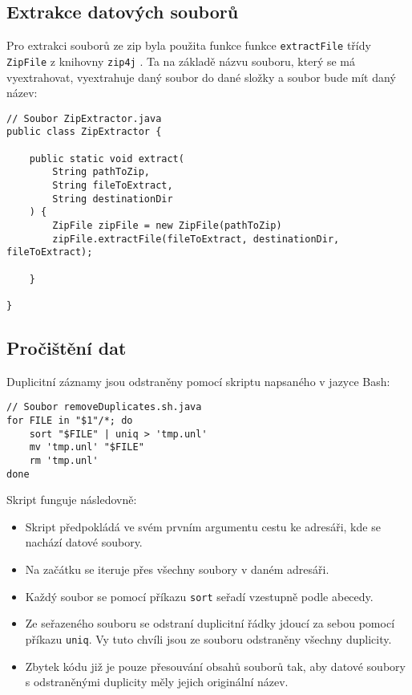 \subsection{Extrakce datových souborů}
Pro extrakci souborů ze zip byla použita funkce funkce \lstinline|extractFile| třídy \lstinline|ZipFile| z knihovny \lstinline|zip4j| \cite{zip4j}. Ta na základě názvu souboru, který se má vyextrahovat, vyextrahuje daný soubor do dané složky a soubor bude mít daný název:

\begin{lstlisting}[caption={Ukázka extrakce souborů ze zipu}, label={lst:zip4j}, tabsize=2]
// Soubor ZipExtractor.java
public class ZipExtractor {

	public static void extract(
		String pathToZip, 
		String fileToExtract, 
		String destinationDir
	) {
		ZipFile zipFile = new ZipFile(pathToZip)
		zipFile.extractFile(fileToExtract, destinationDir, fileToExtract);
		
	}
		
}
\end{lstlisting}

\subsection{Pročištění dat}
Duplicitní záznamy jsou odstraněny pomocí skriptu napsaného v jazyce Bash:

\begin{lstlisting}[caption={Skript pro odstranění duplicitních řádků}, tabsize=2]
// Soubor removeDuplicates.sh.java
for FILE in "$1"/*; do
	sort "$FILE" | uniq > 'tmp.unl'
	mv 'tmp.unl' "$FILE"
	rm 'tmp.unl'
done
\end{lstlisting}

\noindent Skript funguje následovně:

\begin{itemize}
	\item Skript předpokládá ve svém prvním argumentu cestu ke adresáři, kde se nachází datové soubory.
	
	\item Na začátku se iteruje přes všechny soubory v daném adresáři.
	
	\item Každý soubor se pomocí příkazu \lstinline|sort| seřadí vzestupně podle abecedy.
	
	\item Ze seřazeného souboru se odstraní duplicitní řádky jdoucí za sebou pomocí příkazu \lstinline|uniq|. Vy tuto chvíli jsou ze souboru odstraněny všechny duplicity.
	
	\item Zbytek kódu již je pouze přesouvání obsahů souborů tak, aby datové soubory s odstraněnými duplicity měly jejich originální název.
\end{itemize}


